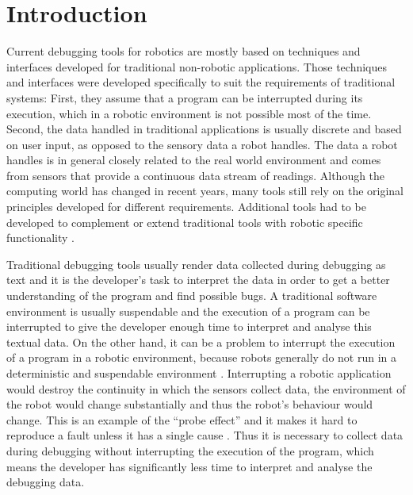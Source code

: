 \chapter{Introduction}


Current debugging tools for robotics are mostly based on techniques and interfaces developed for traditional non-robotic applications. Those techniques and interfaces were developed specifically to suit the requirements of traditional systems: First, they assume that a program can be interrupted during its execution, which in a robotic environment is not possible most of the time. Second, the data handled in traditional applications is usually discrete and based on user input, as opposed to the sensory data a robot handles. The data a robot handles is in general closely related to the real world environment and comes from sensors that provide a continuous data stream of readings. Although the computing world has changed in recent years, many tools still rely on the original principles developed for different requirements. Additional tools had to be developed to complement or extend traditional tools with robotic specific functionality \cite{Gumbley2010}. %


Traditional debugging tools usually render data collected during debugging as text and it is the developer's task to interpret the data in order to get a better understanding of the program and find possible bugs. A traditional software environment is usually suspendable and the execution of a program can be interrupted to give the developer enough time to interpret and analyse this textual data.
On the other hand, it can be a problem to interrupt the execution of a program in a robotic environment, because robots generally do not run in a deterministic and suspendable environment \cite{Gumbley2009}. Interrupting a robotic application would destroy the continuity in which the sensors collect data, the environment of the robot would change substantially and thus the robot's behaviour would change. This is an example of the ``probe effect'' and it makes it hard to reproduce a fault unless it has a single cause \cite{Gumbley2009}. Thus it is necessary to collect data during debugging without interrupting the execution of the program, which means the developer has significantly less time to interpret and analyse the debugging data.

